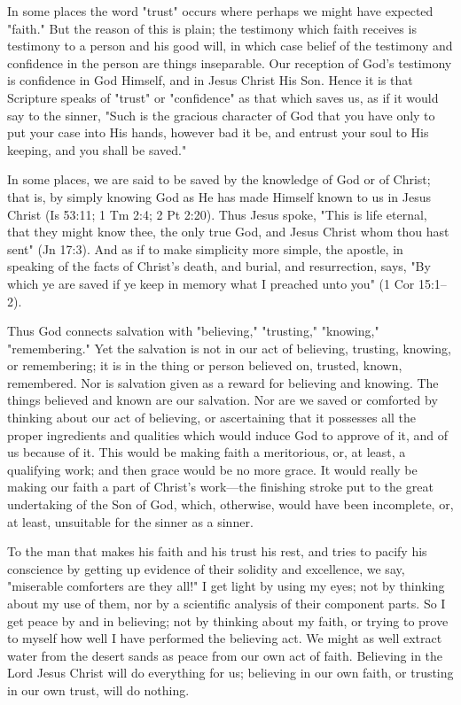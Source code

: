 \documentclass[
]{book}
\begin{document}
In some places the word "trust" occurs where perhaps we might have expected "faith." But the reason of this is plain; the testimony which faith receives is testimony to a person and his good will, in which case belief of the testimony and confidence in the person are things inseparable. Our reception of God's testimony is confidence in God Himself, and in Jesus Christ His Son. Hence it is that Scripture speaks of "trust" or "confidence" as that which saves us, as if it would say to the sinner, "Such is the gracious character of God that you have only to put your case into His hands, however bad it be, and entrust your soul to His keeping, and you shall be saved."

In some places, we are said to be saved by the knowledge of God or of Christ; that is, by simply knowing God as He has made Himself known to us in Jesus Christ (Is 53:11; 1 Tm 2:4; 2 Pt 2:20). Thus Jesus spoke, "This is life eternal, that they might know thee, the only true God, and Jesus Christ whom thou hast sent" (Jn 17:3). And as if to make simplicity more simple, the apostle, in speaking of the facts of Christ's death, and burial, and resurrection, says, "By which ye are saved if ye keep in memory what I preached unto you" (1 Cor 15:1--2).

Thus God connects salvation with "believing," "trusting," "knowing," "remembering." Yet the salvation is not in our act of believing, trusting, knowing, or remembering; it is in the thing or person believed on, trusted, known, remembered. Nor is salvation given as a reward for believing and knowing. The things believed and known are our salvation. Nor are we saved or comforted by thinking about our act of believing, or ascertaining that it possesses all the proper ingredients and qualities which would induce God to approve of it, and of us because of it. This would be making faith a meritorious, or, at least, a qualifying work; and then grace would be no more grace. It would really be making our faith a part of Christ's work---the finishing stroke put to the great undertaking of the Son of God, which, otherwise, would have been incomplete, or, at least, unsuitable for the sinner as a sinner.

To the man that makes his faith and his trust his rest, and tries to pacify his conscience by getting up evidence of their solidity and excellence, we say, "miserable comforters are they all!" I get light by using my eyes; not by thinking about my use of them, nor by a scientific analysis of their component parts. So I get peace by and in believing; not by thinking about my faith, or trying to prove to myself how well I have performed the believing act. We might as well extract water from the desert sands as peace from our own act of faith. Believing in the Lord Jesus Christ will do everything for us; believing in our own faith, or trusting in our own trust, will do nothing.
\end{document}
